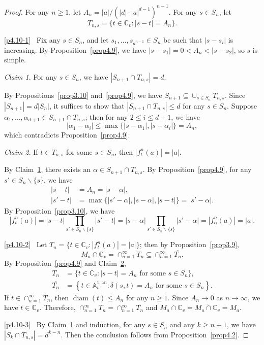 \documentclass[10pt,a4paper]{amsart}
\numberwithin{equation}{section}
\theoremstyle{plain}
\theoremstyle{definition}
\theoremstyle{remark}
\newtheorem{claim}{Claim}
\DeclareMathOperator{\diam}{diam}
\newcommand{\A}{\mathbb A}
\newcommand{\C}{\mathbb C}
\newcommand{\an}{\mathrm{an}}
\begin{document}
\begin{proof}
For any $n\geq1$, let $A_{n}=|a|/(|d|\cdot|a|^{d-1})^{n-1}$. For any
$s\in S_{n}$, let
\[
T_{n,s}=\{t\in\C_{v}:|s-t|=A_{n}\}.
\]

\eqref{p4.10-1}~
 Fix any $s\in S_{n}$, and let $s_{1},\dots,s_{d^{n-1}}\in S_{n}$
be such that $|s-s_{i}|$ is increasing. By Proposition~\ref{prop4.9},
we have $|s-s_{1}|=0<A_{n}<|s-s_{2}|$, so $s$ is simple.

\begin{claim}\label{claim1}
For any $s\in S_{n}$, we have $|S_{n+1}\cap T_{n,s}|=d$.
\end{claim}

By Propositions~\ref{prop3.10} and~\ref{prop4.9}, we have
$S_{n+1}\subseteq\cup_{s\in S_{n}}T_{n,s}$.  Since
$|S_{n+1}|=d|S_{n}|$, it suffices to show that $|S_{n+1}\cap
T_{n,s}|\leq d$ for any $s\in S_{n}$. Suppose
$\alpha_{1},\dots,\alpha_{d+1}\in S_{n+1}\cap T_{n,s}$; then for any
$2\leq i\leq d+1$, we have
\[
|\alpha_{1}-\alpha_{i}|\leq\max\{|s-\alpha_{1}|,|s-\alpha_{i}|\}=A_{n},
\]
which contradicts Proposition~\ref{prop4.9}.

\begin{claim}\label{claim2}
If $t\in T_{n,s}$ for some $s\in S_{n}$, then
$|f_{t}^{n}(a)|=|a|$.
\end{claim}

By Claim~\ref{claim1}, there exists an $\alpha\in S_{n+1}\cap T_{n,s}$. By Proposition~\ref{prop4.9}, for any $s'\in S_{n}\backslash\{s\}$, we have
\begin{align*}
|s-t| & =A_{n}=|s-\alpha|,\\
|s'-t| & =\max\{|s'-\alpha|,|s-\alpha|,|s-t|\}=|s'-\alpha|.
\end{align*}
By Proposition~\ref{prop3.10}, we have
\[
|f_{t}^{n}(a)|=|s-t|\prod_{s'\in S_{n}\backslash\{s\}}|s'-t|=|s-\alpha|\prod_{s'\in S_{n}\backslash\{s\}}|s'-\alpha|=|f_{\alpha}^{n}(a)|=|a|.
\]

\eqref{p4.10-2}~ Let $T_{n}=\{t\in\C_{v}:|f_{t}^{n}(a)|=|a|\}$; then by
Proposition~\ref{prop3.9},
\[
M_{a}\cap\C_{v}=\cap_{n=1}^{\infty}T_{n}\subseteq\cap_{n=1}^{\infty}\overline{T_{n}}.
\]
By Proposition~\ref{prop4.9} and Claim~\ref{claim2},
\begin{align*}
T_{n} & =\{t\in\C_{v}:|s-t|=A_{n}\text{ for some }s\in S_{n}\},\\
\overline{T_{n}}& =\left\{t\in\A_{v}^{1,\an}:\delta(s,t)=A_{n}\text{ for some }s\in S_{n}\right\}.
\end{align*}
If $t\in\cap_{n=1}^{\infty}\overline{T_{n}}$, then $\diam(t)\leq A_{n}$
for any $n\geq1$. Since $A_{n}\to0$ as $n\to\infty$, we have $t\in\C_{v}$.
Therefore, $\cap_{n=1}^{\infty}T_{n}=\cap_{n=1}^{\infty}\overline{T_{n}}$
and $M_{a}\cap\C_{v}=\overline{M_{a}\cap\C_{v}}=M_{a}$.

\eqref{p4.10-3}~
 By Claim~\ref{claim1} and induction, for any $s\in S_{n}$ and any $k\geq n+1$,
we have $|S_{k}\cap T_{n,s}|=d^{k-n}$. Then the conclusion follows
from Proposition~\ref{prop4.2}.
\end{proof}
\end{document}
